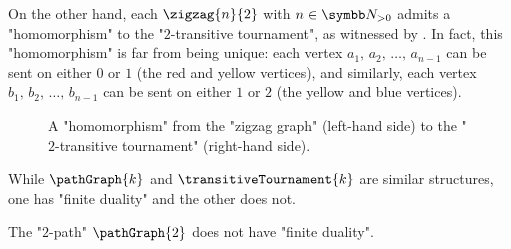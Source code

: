 \begin{example}
	On the other hand, each $\zigzag{n}{2}$ with $n\in\Np$ admits a "homomorphism" to the "$2$-transitive tournament", as witnessed by .%
	In fact, this "homomorphism" is far from being unique:
	each vertex $a_1,\,a_2,\,\dotsc,\,a_{n-1}$ can be sent on either $0$ or $1$
	(the red and yellow vertices), 
	and similarly, each vertex $b_1,\,b_2,\,\dotsc,\,b_{n-1}$ can be sent on either $1$ or $2$
	(the yellow and blue vertices).%
	\begin{figure}
		\centering 
		\begin{tikzpicture}
			
		\end{tikzpicture}
		\caption{\AP\label{fig:zigzag-graph-hom-T2}A "homomorphism" from the "zigzag graph" (left-hand side) to the "$2$-transitive tournament" (right-hand side).}
	\end{figure}
\end{example}

While $\pathGraph{k}$ and $\transitiveTournament{k}$ are similar structures,
one has "finite duality" and the other does not.

\begin{proposition}
	\AP\label{prop:2-path-infinite-duality}
	The "$2$-path" $\pathGraph{2}$ does not have "finite duality".
\end{proposition}

